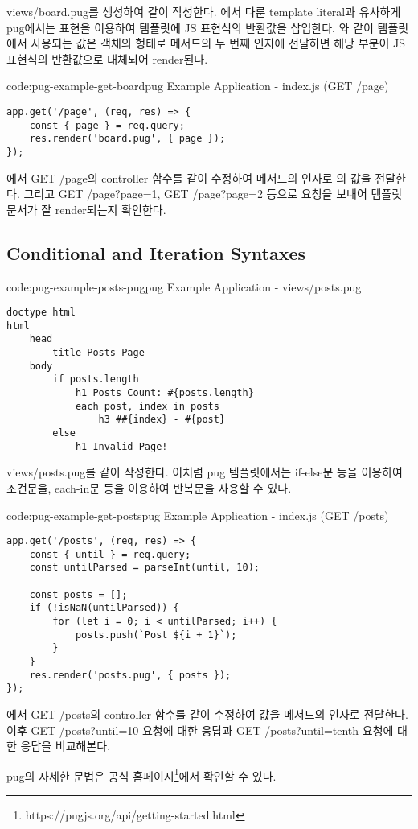 views/board.pug를 생성하여 \와 같이 작성한다. 에서 다룬 template literal과 유사하게 pug에서는 \cd{\#\{\}} 표현을 이용하여 템플릿에 JS 표현식의 반환값을 삽입한다. 와 같이 템플릿에서 사용되는 값은 객체의 형태로  메서드의 두 번째 인자에 전달하면 해당 부분이 JS 표현식의 반환값으로 대체되어 render된다.

\begin{codeenv}{code:pug-example-get-board}{pug Example Application - index.js (GET /page)}\begin{verbatim}
app.get('/page', (req, res) => {
    const { page } = req.query;
    res.render('board.pug', { page });
});
\end{verbatim}
\end{codeenv}

에서 GET /page의 controller 함수를 \와 같이 수정하여  메서드의 인자로 의 값을 전달한다. 그리고 GET /page?page=1, GET /page?page=2 등으로 요청을 보내어 템플릿 문서가 잘 render되는지 확인한다.
\clearpage

\subsection*{Conditional and Iteration Syntaxes}

\begin{codeenv}{code:pug-example-posts-pug}{pug Example Application - views/posts.pug}\begin{verbatim}
doctype html
html
    head
        title Posts Page
    body
        if posts.length
            h1 Posts Count: #{posts.length}
            each post, index in posts
                h3 ##{index} - #{post}
        else
            h1 Invalid Page!
\end{verbatim}
\end{codeenv}

views/posts.pug를 \와 같이 작성한다. 이처럼 pug 템플릿에서는 if-else문 등을 이용하여 조건문을, each-in문 등을 이용하여 반복문을 사용할 수 있다.

\begin{codeenv}{code:pug-example-get-posts}{pug Example Application - index.js (GET /posts)}\begin{verbatim}
app.get('/posts', (req, res) => {
    const { until } = req.query;
    const untilParsed = parseInt(until, 10);

    const posts = [];
    if (!isNaN(untilParsed)) {
        for (let i = 0; i < untilParsed; i++) {
            posts.push(`Post ${i + 1}`);
        }
    }
    res.render('posts.pug', { posts });
});
\end{verbatim}
\end{codeenv}

에서 GET /posts의 controller 함수를 \와 같이 수정하여  값을  메서드의 인자로 전달한다. 이후 GET /posts?until=10 요청에 대한 응답과 GET /posts?until=tenth 요청에 대한 응답을 비교해본다.

pug의 자세한 문법은 공식 홈페이지\footnote{https://pugjs.org/api/getting-started.html}에서 확인할 수 있다.
